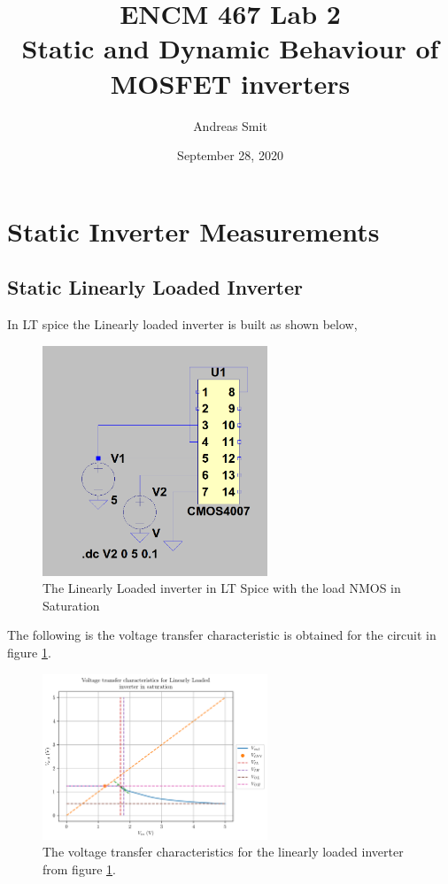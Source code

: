 \documentclass[titlepage, 12pt]{article}
\title{ENCM 467 Lab 2\\Static and Dynamic Behaviour of MOSFET inverters}
\author{Andreas Smit}
\date{September 28, 2020}
\begin{document}
    \maketitle

    \section{Static Inverter Measurements}
    \subsection{Static Linearly Loaded Inverter}
    In LT spice the Linearly loaded inverter is built as shown below,
    \begin{figure}[H]
        \centering

        \includegraphics[width=0.6\textwidth]{figures/part_2a_sat_circ.png}
        \caption{The Linearly Loaded inverter in LT Spice with the
        load NMOS in Saturation}
        \label{fig:2a_sat_circ}
    \end{figure}
    The following is the voltage transfer characteristic is obtained for
    the circuit in figure \ref{fig:2a_sat_circ}.
    \begin{figure}[H]
        \centering
        \includegraphics[width=0.6\textwidth]{figures/part_2a_sat.png}
        \caption{The voltage transfer characteristics for the linearly
            loaded inverter from figure \ref{fig:2a_sat_circ}.}
            \label{fig:2a_sat}
    \end{figure}
\end{document}
